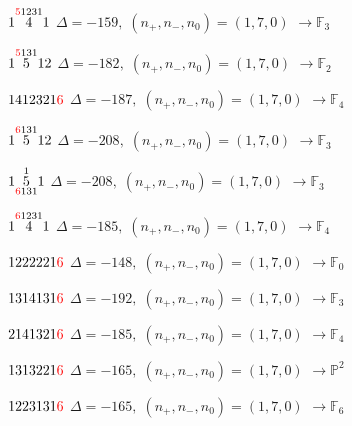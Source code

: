 \documentclass[10pt]{article}
\begin{document}
\smallskip

$1\overset{\textcolor{red}{5}1231}{4}1$ \quad $\Delta=-159,\; (n_+,n_-,n_0)=(1,7,0)$ \quad $\to \mathbb{F}_{3}$

\smallskip

$1\overset{\textcolor{red}{5}131}{5}12$ \quad $\Delta=-182,\; (n_+,n_-,n_0)=(1,7,0)$ \quad $\to \mathbb{F}_{2}$

\smallskip

$1412321\textcolor{red}{6}$ \quad $\Delta=-187,\; (n_+,n_-,n_0)=(1,7,0)$ \quad $\to \mathbb{F}_{4}$

\smallskip

$1\overset{\textcolor{red}{6}131}{5}12$ \quad $\Delta=-208,\; (n_+,n_-,n_0)=(1,7,0)$ \quad $\to \mathbb{F}_{3}$

\smallskip

$1\overset{1}{\underset{\textcolor{red}{6}131}{5}}1$ \quad $\Delta=-208,\; (n_+,n_-,n_0)=(1,7,0)$ \quad $\to \mathbb{F}_{3}$

\smallskip

$1\overset{\textcolor{red}{6}1231}{4}1$ \quad $\Delta=-185,\; (n_+,n_-,n_0)=(1,7,0)$ \quad $\to \mathbb{F}_{4}$

\smallskip

$1222221\textcolor{red}{6}$ \quad $\Delta=-148,\; (n_+,n_-,n_0)=(1,7,0)$ \quad $\to \mathbb{F}_{0}$

\smallskip

$1314131\textcolor{red}{6}$ \quad $\Delta=-192,\; (n_+,n_-,n_0)=(1,7,0)$ \quad $\to \mathbb{F}_{3}$

\smallskip

$2141321\textcolor{red}{6}$ \quad $\Delta=-185,\; (n_+,n_-,n_0)=(1,7,0)$ \quad $\to \mathbb{F}_{4}$

\smallskip

$1313221\textcolor{red}{6}$ \quad $\Delta=-165,\; (n_+,n_-,n_0)=(1,7,0)$ \quad $\to \mathbb{P}^2$

$1223131\textcolor{red}{6}$ \quad $\Delta=-165,\; (n_+,n_-,n_0)=(1,7,0)$ \quad $\to \mathbb{F}_{6}$
\end{document}
